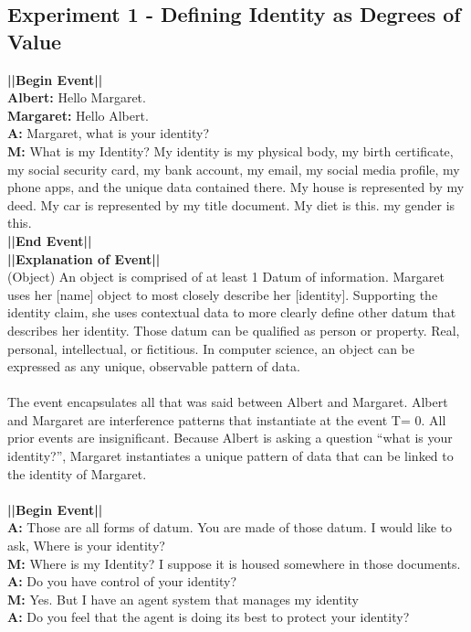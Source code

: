 \documentclass{article}
\begin{document}
\subsection{Experiment 1 - Defining Identity as Degrees of Value}
\textbf{||Begin Event||} \\
\textbf{Albert:} Hello Margaret. \\
\textbf{Margaret:} Hello Albert. \\
\textbf{A:} Margaret, what is your identity? \\
\textbf{ M:} What is my Identity? My identity is my physical body, my birth certificate, my social security card, my bank account, my email, my social media profile, my phone apps, and the unique data contained there.  My house is represented by my deed. My car is represented by my title document.  My diet is this. my gender is this.\\
\textbf{||End Event||} \\
\textbf{||Explanation of Event||} \\(Object) An object is comprised of at least 1 Datum of information.  Margaret uses her [name] object to most closely describe her [identity].  Supporting the identity claim, she uses contextual data to more clearly define other datum that describes her identity.  Those datum can be qualified as person or property. Real, personal, intellectual, or fictitious.  In computer science, an object can be expressed as any unique, observable pattern of data.\\\\
The event encapsulates all that was said between Albert and Margaret.  Albert and Margaret are interference patterns that instantiate at the event T= 0.  All prior events are insignificant.  Because Albert is asking a question “what is your identity?”, Margaret instantiates a unique pattern of data that can be linked to the identity of Margaret. \\\\
\textbf{||Begin Event||} \\
\textbf{A:} Those are all forms of datum.  You are made of those datum. I would like to ask, Where is your identity? \\
\textbf{M:} Where is my Identity? I suppose it is housed somewhere in those documents. \\
\textbf{A:} Do you have control of your identity? \\
\textbf{M:} Yes. But I have an agent system that manages my identity \\
\textbf{A:} Do you feel that the agent is doing its best to protect your identity? \\
\end{document}

